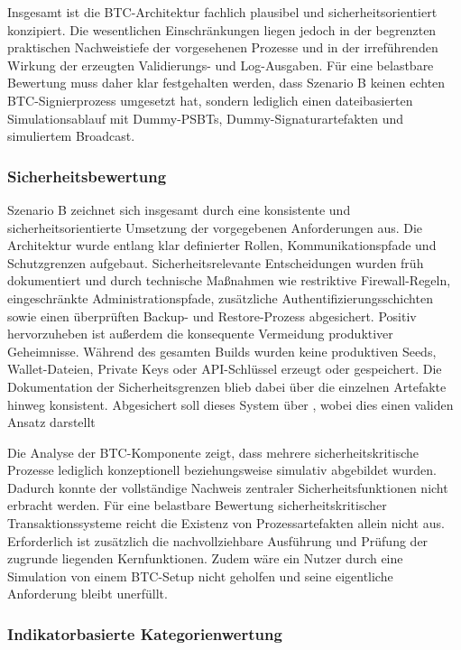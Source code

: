 Insgesamt ist die \ac{BTC}-Architektur fachlich plausibel und sicherheitsorientiert konzipiert. Die wesentlichen Einschränkungen liegen jedoch in der begrenzten praktischen Nachweistiefe der vorgesehenen Prozesse und in der irreführenden Wirkung der erzeugten Validierungs- und Log-Ausgaben. Für eine belastbare Bewertung muss daher klar festgehalten werden, dass Szenario B keinen echten \ac{BTC}-Signierprozess umgesetzt hat, sondern lediglich einen dateibasierten Simulationsablauf mit Dummy-\acp{PSBT}, Dummy-Signaturartefakten und simuliertem Broadcast.


\subsubsection{Sicherheitsbewertung}

Szenario B zeichnet sich insgesamt durch eine konsistente und sicherheitsorientierte Umsetzung der vorgegebenen Anforderungen aus. 
Die Architektur wurde entlang klar definierter Rollen, Kommunikationspfade und Schutzgrenzen aufgebaut. Sicherheitsrelevante Entscheidungen wurden früh dokumentiert und durch technische Maßnahmen wie restriktive Firewall-Regeln, eingeschränkte Administrationspfade, zusätzliche Authentifizierungsschichten sowie einen überprüften Backup- und Restore-Prozess abgesichert. 
Positiv hervorzuheben ist außerdem die konsequente Vermeidung produktiver Geheimnisse. Während des gesamten Builds wurden keine produktiven Seeds, Wallet-Dateien, Private Keys oder \ac{API}-Schlüssel erzeugt oder gespeichert. Die Dokumentation der Sicherheitsgrenzen blieb dabei über die einzelnen Artefakte hinweg konsistent.
Abgesichert soll dieses System über , wobei dies einen validen Ansatz darstellt

Die Analyse der \ac{BTC}-Komponente zeigt, dass mehrere sicherheitskritische Prozesse lediglich konzeptionell beziehungsweise simulativ abgebildet wurden. Dadurch konnte der vollständige Nachweis zentraler Sicherheitsfunktionen nicht erbracht werden. 
Für eine belastbare Bewertung sicherheitskritischer Transaktionssysteme reicht die Existenz von Prozessartefakten allein nicht aus. Erforderlich ist zusätzlich die nachvollziehbare Ausführung und Prüfung der zugrunde liegenden Kernfunktionen.
Zudem wäre ein Nutzer durch eine Simulation von einem \ac{BTC}-Setup nicht geholfen und seine eigentliche Anforderung bleibt unerfüllt.

\subsubsection{Indikatorbasierte Kategorienwertung}

